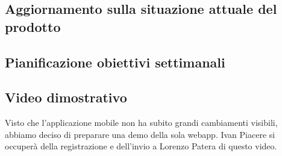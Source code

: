 \subsection*{Aggiornamento sulla situazione attuale del prodotto}
\subsection*{Pianificazione obiettivi settimanali}
\subsection*{Video dimostrativo}
Visto che l'applicazione mobile non ha subito grandi cambiamenti visibili, abbiamo deciso di preparare una demo della sola webapp. Ivan Piacere si occuperà della registrazione e dell'invio a Lorenzo Patera di questo video.

